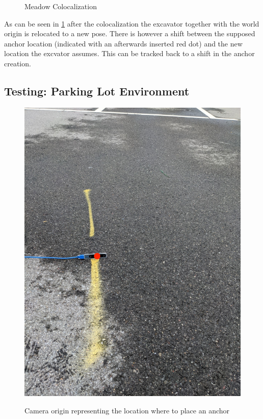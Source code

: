 \begin{figure}[htp]
    \centering
        \hfill
        \hfill
    \caption{Meadow Colocalization}
    \label{fig:meadow_basic}
\end{figure}

As can be seen in \cref{fig:meadow_basic} after the colocalization the excavator together with the world origin is relocated to a new pose. There is however a shift between the supposed anchor location (indicated with an afterwards inserted red dot) and the new location the excvator assumes. This can be tracked back to a shift in the anchor creation. 

\clearpage

\subsection*{Testing: Parking Lot Environment}\label{subsec:parking_lot}

\begin{figure}[ht]
    \centering
    \includegraphics[scale = 0.28]{images/colocalization/parking_lot_start.jpg}
    \label{fig:parking_lot_start}
    \caption{Camera origin representing the location where to place an anchor}
\end{figure}
\clearpage

